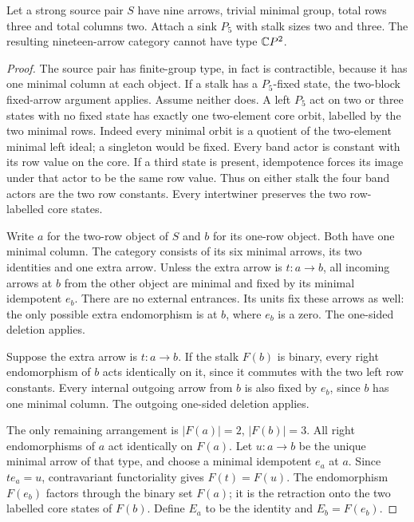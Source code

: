 \begin{lemma}
\label{CP2:A-nine-pair-P5-five-stalks}
Let a strong source pair $S$ have nine arrows, trivial minimal
group, total rows three and total columns two. Attach a sink
$P_5$ with stalk sizes two and three. The resulting nineteen-arrow
category cannot have type $\mathbb{C}P^2$.
\end{lemma}
\begin{proof}
The source pair has finite-group type, in fact is contractible,
because it has one minimal column at each object. If a stalk has
a $P_5$-fixed state, the two-block fixed-arrow argument applies.
Assume neither does. A left $P_5$ act on two or three states with
no fixed state has exactly one two-element core orbit, labelled
by the two minimal rows. Indeed every minimal orbit is a quotient
of the two-element minimal left ideal; a singleton would be fixed.
Every band actor is constant with its row value on the core.
If a third state is present, idempotence forces its image under
that actor to be the same row value. Thus on either stalk the
four band actors are the two row constants. Every intertwiner
preserves the two row-labelled core states.

Write $a$ for the two-row object of $S$ and $b$ for its one-row
object. Both have one minimal column. The category consists of
its six minimal arrows, its two identities and one extra arrow.
Unless the extra arrow is $t:a\to b$, all incoming arrows at
$b$ from the other object are minimal and fixed by its minimal
idempotent $e_b$. There are no external entrances. Its units fix
these arrows as well: the only possible extra endomorphism is
at $b$, where $e_b$ is a zero. The one-sided deletion applies.

Suppose the extra arrow is $t:a\to b$. If the stalk $F(b)$ is
binary, every right endomorphism of $b$ acts identically on it,
since it commutes with the two left row constants. Every internal
outgoing arrow from $b$ is also fixed by $e_b$, since $b$ has one
minimal column. The outgoing one-sided deletion applies.

The only remaining arrangement is $|F(a)|=2$, $|F(b)|=3$.
All right endomorphisms of $a$ act identically on $F(a)$.
Let $u:a\to b$ be the unique minimal arrow of that type, and
choose a minimal idempotent $e_a$ at $a$. Since $te_a=u$,
contravariant functoriality gives $F(t)=F(u)$.
The endomorphism $F(e_b)$ factors through the binary set $F(a)$;
it is the retraction onto the two labelled core states of $F(b)$.
Define $E_a$ to be the identity and $E_b=F(e_b)$.


\end{proof}
